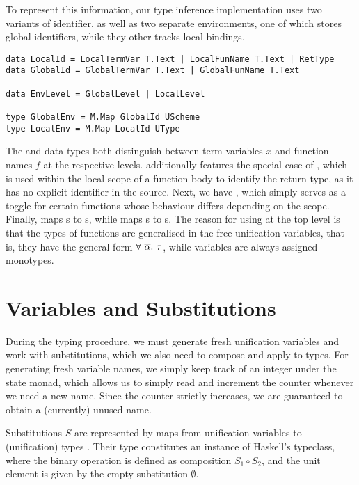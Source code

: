 To represent this information, our type inference implementation uses two
variants of identifier, as well as two separate environments, one of which
stores global identifiers, while they other tracks local bindings.

\begin{verbatim}
data LocalId = LocalTermVar T.Text | LocalFunName T.Text | RetType
data GlobalId = GlobalTermVar T.Text | GlobalFunName T.Text

data EnvLevel = GlobalLevel | LocalLevel

type GlobalEnv = M.Map GlobalId UScheme
type LocalEnv = M.Map LocalId UType
\end{verbatim}

The  and  data types both distinguish between
term variables $x$ and function names $f$ at the respective levels.
 additionally features the special case of ,
which is used within the local scope of a function body to identify the return
type, as it has no explicit identifier in the source.
Next, we have , which simply serves as a toggle for certain
functions whose behaviour differs depending on the scope.
Finally,  maps s to s,
while  maps s to s.
The reason for using  at the top level is that the types of
functions are generalised in the free unification variables, that is, they have
the general form $\forall\ \set{\alpha}.\ \tau$, while variables are always
assigned monotypes.


\section{Variables and Substitutions}

During the typing procedure, we must generate fresh unification variables and
work with substitutions, which we also need to compose and apply to types.
For generating fresh variable names, we simply keep track of an integer
 under the state monad, which allows us to simply read and
increment the counter whenever we need a new name. Since the counter strictly
increases, we are guaranteed to obtain a (currently) unused name.

Substitutions $S$ are represented by maps from unification variables
 to (unification) types . Their type 
constitutes an instance of Haskell's  typeclass, where the
binary operation is defined as composition $S_1 \circ S_2$, and the unit element
is given by the empty substitution $\emptyset$.


